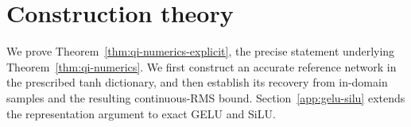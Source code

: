 \providecommand{\R}{\mathbb R}
\providecommand{\C}{\mathbb C}
\providecommand{\Om}{\Omega}
\providecommand{\eps}{\varepsilon}
\providecommand{\dist}{\operatorname{dist}}
\providecommand{\sech}{\operatorname{sech}}
\providecommand{\norm}[1]{\ensuremath{\left\lVert #1\right\rVert}}
\providecommand{\Erep}{E_{\mathrm{rep}}}
\providecommand{\Cbd}{C_{\mathrm{bd}}}
\providecommand{\Dlam}{D_\lambda}
\providecommand{\capp}{c_{\mathrm{app}}}
\providecommand{\QUILLMainTheorem}{Theorem~\ref{thm:qi-numerics}}
\providecommand{\QUILLMainCorollary}{Corollary~\ref{cor:qi-log-width}}
\providecommand{\qeqref}[1]{(\ref{#1})}

\section{Construction theory}
\label{app:construction-theory}

We prove Theorem~\ref{thm:qi-numerics-explicit}, the precise statement underlying
\QUILLMainTheorem. We first construct an accurate reference network in the
prescribed tanh dictionary, and then establish its recovery from in-domain
samples and the resulting continuous-RMS bound. Section~\ref{app:gelu-silu}
extends the representation argument to exact GELU and SiLU.

